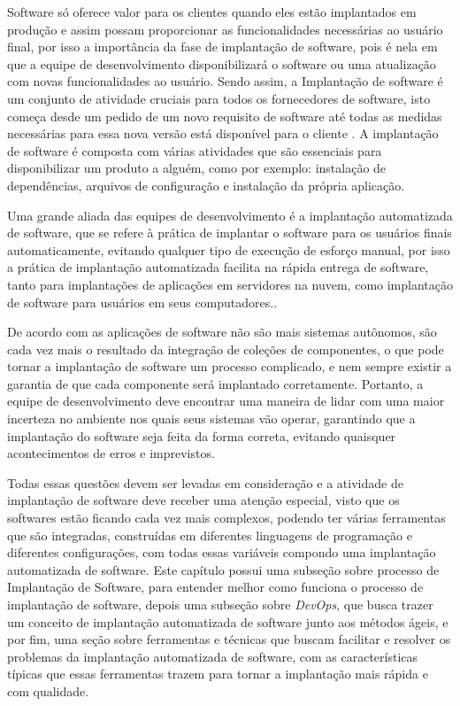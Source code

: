 Software só oferece valor para os clientes quando eles estão implantados em produção
e assim possam proporcionar as funcionalidades necessárias ao usuário final,
por isso a importância da fase de implantação de software, pois é nela em que a equipe
de desenvolvimento disponibilizará o software ou uma atualização com novas funcionalidades
ao usuário. Sendo assim, a Implantação de software é um conjunto de atividade cruciais
para todos os fornecedores de software, isto começa desde um pedido de um novo requisito
de software até todas as medidas necessárias para essa nova versão está disponível
para o cliente \cite{5741269}. A implantação de software é composta com várias
atividades que são essenciais para disponibilizar um produto a alguém, como por exemplo:
instalação de dependências, arquivos de configuração e instalação da própria aplicação.

Uma grande aliada das equipes de desenvolvimento é a implantação automatizada de
software, que se refere à prática de implantar o software para os usuários finais
automaticamente, evitando qualquer tipo de execução de esforço manual, por isso
a prática de implantação automatizada facilita na rápida entrega de software, tanto
para implantações de aplicações em servidores na nuvem, como implantação de software
para usuários em seus computadores.\cite{7284592}.

De acordo com \cite{deployment1998} as aplicações de software não são mais
sistemas autônomos, são cada vez mais o resultado da integração de coleções de
componentes, o que pode tornar a implantação de software um processo complicado, e
nem sempre existir a garantia de que cada componente será implantado corretamente.
Portanto, a equipe de desenvolvimento deve encontrar uma maneira de lidar
com uma maior incerteza no ambiente nos quais seus sistemas vão operar, garantindo
que a implantação do software seja feita da forma correta, evitando quaisquer acontecimentos
de erros e imprevistos.

Todas essas questões devem ser levadas em consideração e a atividade de implantação de
software deve receber uma atenção especial, visto que os softwares estão ficando
cada vez mais complexos, podendo ter várias ferramentas que são integradas, construídas
em diferentes linguagens de programação e diferentes configurações, com todas
essas variáveis compondo
uma implantação automatizada de software. Este capítulo possui uma subseção sobre
processo de Implantação de Software, para entender melhor como funciona o processo
de implantação
de software, depois uma subseção sobre \textit{DevOps}, que busca trazer um conceito de implantação
automatizada de software junto aos métodos ágeis, e por fim, uma seção sobre
ferramentas e técnicas que buscam facilitar e resolver os problemas da
implantação automatizada de software, com as características típicas que essas
ferramentas trazem para tornar a implantação mais rápida e com qualidade.

